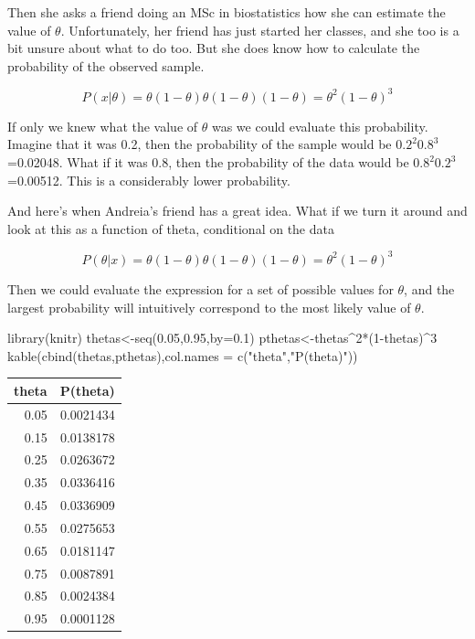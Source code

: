 \documentclass[
]{book}
\newenvironment{Shaded}{\begin{snugshade}}{\end{snugshade}}
\newcommand{\AttributeTok}[1]{\textcolor[rgb]{0.77,0.63,0.00}{#1}}
\newcommand{\DecValTok}[1]{\textcolor[rgb]{0.00,0.00,0.81}{#1}}
\newcommand{\FloatTok}[1]{\textcolor[rgb]{0.00,0.00,0.81}{#1}}
\newcommand{\FunctionTok}[1]{\textcolor[rgb]{0.00,0.00,0.00}{#1}}
\newcommand{\NormalTok}[1]{#1}
\newcommand{\OtherTok}[1]{\textcolor[rgb]{0.56,0.35,0.01}{#1}}
\newcommand{\SpecialCharTok}[1]{\textcolor[rgb]{0.00,0.00,0.00}{#1}}
\newcommand{\StringTok}[1]{\textcolor[rgb]{0.31,0.60,0.02}{#1}}
\begin{document}
Then she asks a friend doing an MSc in biostatistics how she can estimate the value of \(\theta\). Unfortunately, her friend has just started her classes, and she too is a bit unsure about what to do too. But she does know how to calculate the probability of the observed sample.

\[P(x|\theta)=\theta (1-\theta) \theta (1-\theta)  (1-\theta)=\theta^2 (1-\theta)^3\]

If only we knew what the value of \(\theta\) was we could evaluate this probability. Imagine that it was 0.2, then the probability of the sample would be \(0.2^2 0.8^3\)=0.02048. What if it was 0.8, then the probability of the data would be \(0.8^2 0.2^3\)=0.00512. This is a considerably lower probability.

And here's when Andreia's friend has a great idea. What if we turn it around and look at this as a function of theta, conditional on the data

\[P(\theta|x)=\theta (1-\theta)  \theta (1-\theta) (1-\theta)=\theta^2 (1-\theta)^3\]

Then we could evaluate the expression for a set of possible values for \(\theta\), and the largest probability will intuitively correspond to the most likely value of \(\theta\).

\begin{Shaded}
\begin{Highlighting}[]
\FunctionTok{library}\NormalTok{(knitr)}
\NormalTok{thetas}\OtherTok{\textless{}{-}}\FunctionTok{seq}\NormalTok{(}\FloatTok{0.05}\NormalTok{,}\FloatTok{0.95}\NormalTok{,}\AttributeTok{by=}\FloatTok{0.1}\NormalTok{)}
\NormalTok{pthetas}\OtherTok{\textless{}{-}}\NormalTok{thetas}\SpecialCharTok{\^{}}\DecValTok{2}\SpecialCharTok{*}\NormalTok{(}\DecValTok{1}\SpecialCharTok{{-}}\NormalTok{thetas)}\SpecialCharTok{\^{}}\DecValTok{3}
\FunctionTok{kable}\NormalTok{(}\FunctionTok{cbind}\NormalTok{(thetas,pthetas),}\AttributeTok{col.names =} \FunctionTok{c}\NormalTok{(}\StringTok{"theta"}\NormalTok{,}\StringTok{"P(theta)"}\NormalTok{))}
\end{Highlighting}
\end{Shaded}

\begin{tabular}{r|r}
\hline
theta & P(theta)\\
\hline
0.05 & 0.0021434\\
\hline
0.15 & 0.0138178\\
\hline
0.25 & 0.0263672\\
\hline
0.35 & 0.0336416\\
\hline
0.45 & 0.0336909\\
\hline
0.55 & 0.0275653\\
\hline
0.65 & 0.0181147\\
\hline
0.75 & 0.0087891\\
\hline
0.85 & 0.0024384\\
\hline
0.95 & 0.0001128\\
\hline
\end{tabular}
\end{document}
